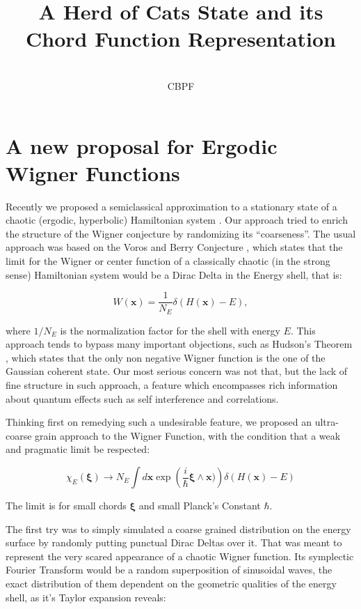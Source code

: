 \documentclass[a4paper,12pt]{article}
\title{A Herd of Cats State and its Chord Function Representation}
\author{\\CBPF}
\newcommand{\ihb}{\frac{i}{\hbar}}
\newcommand{\xfase}{\mathbf{x}}
\newcommand{\xifase}{ {\boldsymbol{\xi}} }
\begin{document}
\maketitle

\begin{abstract}

\end{abstract}


\section{A new proposal for Ergodic Wigner Functions}

Recently we proposed a semiclassical approximation to 
a stationary state of a chaotic (ergodic, hyperbolic)
Hamiltonian system \cite{Deltas}.
Our approach tried to enrich the structure of the Wigner
conjecture by randomizing its ``coarseness''.  
The usual approach was based on the Voros and Berry
Conjecture \cite{Voros76, BerryRIR}, which states that
the limit for the Wigner or center function of a classically
chaotic (in the strong sense) Hamiltonian system would be
a Dirac Delta in the Energy shell, that is:

\begin{equation}
W(\xfase)=\frac{1}{N_E} \delta(H(\xfase)-E), 
\end{equation}

where $1/N_E$ is the normalization factor for the 
shell with energy  $E$. This approach tends to bypass
many important objections, such as Hudson's Theorem
\cite{Hudson}, which states that the only non negative
Wigner function is the one of the Gaussian coherent state.
Our most serious concern was not that, but the lack
of fine structure in such approach, a feature which
encompasses rich information about quantum effects
such as self interference and correlations. 

Thinking first on remedying such a undesirable feature,
we proposed an ultra-coarse grain approach to the Wigner
Function, with the condition that a weak and pragmatic
limit be respected:

\begin{equation}
\chi_E(\xifase)\rightarrow N_E 
\int d \xfase \exp\left(\ihb \xifase \wedge \xfase) \right)
\delta(H(\xfase)-E)
\end{equation}

The limit is for small chords $\xifase$ and small Planck's
Constant $\hbar$.

The first try was to simply simulated a coarse grained
distribution on the energy surface by randomly putting
punctual Dirac Deltas over it. That was meant to represent
the very scared appearance of a chaotic Wigner function.
Its symplectic Fourier Transform would be a random superposition
of sinusoidal waves, the exact distribution of them dependent
on the geometric qualities of the energy shell, as 
it's Taylor expansion reveals:
\end{document}
